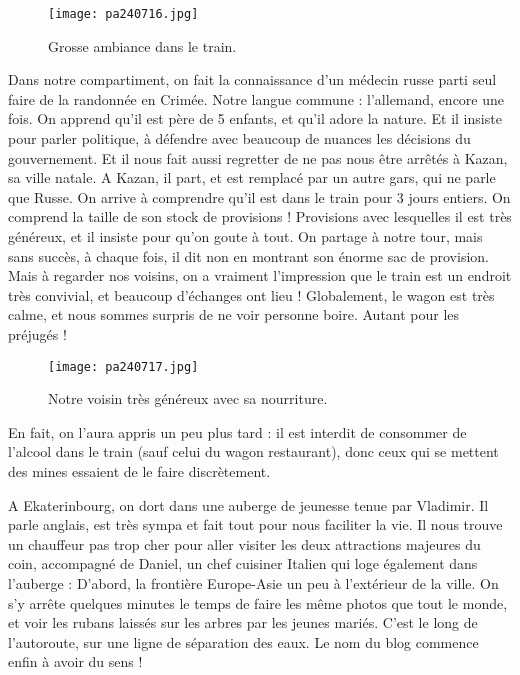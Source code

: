 \documentclass{book}
\begin{document}
\begin{figure}[h]
\centering
\texttt{[image: pa240716.jpg]}
\caption*{ Grosse ambiance dans le train.}
\end{figure}

Dans notre compartiment, on fait la connaissance d'un  médecin russe parti seul faire de la randonnée en Crimée. Notre langue commune : l'allemand, encore une fois. On apprend qu'il est père de 5 enfants, et qu'il adore la nature. Et il insiste pour parler politique, à défendre avec beaucoup de nuances les décisions du gouvernement. Et il nous fait aussi regretter de ne pas nous être arrêtés à Kazan, sa ville natale.
A Kazan, il part, et est remplacé par un autre gars, qui ne parle que Russe. On arrive à comprendre qu'il est dans le train pour 3 jours entiers. On comprend la taille de son stock de provisions ! Provisions avec lesquelles il est très généreux, et il insiste pour qu'on goute à tout. On partage à notre tour, mais sans succès, à chaque fois, il dit non en montrant son énorme sac de provision. Mais à regarder nos voisins, on a vraiment l'impression que le train est un endroit très convivial, et beaucoup d'échanges ont lieu !
Globalement, le wagon est très calme, et nous sommes surpris de ne voir personne boire. Autant pour les préjugés !


\begin{figure}[h]
\centering
\texttt{[image: pa240717.jpg]}
\caption*{ Notre voisin très généreux avec sa nourriture.}
\end{figure}

En fait, on l'aura appris un peu plus tard : il est interdit de consommer de l'alcool dans le train (sauf celui du wagon restaurant), donc ceux qui se mettent des mines essaient de le faire discrètement.

A Ekaterinbourg, on dort dans une auberge de jeunesse tenue par Vladimir. Il parle anglais, est très sympa et fait tout pour nous faciliter la vie. Il nous trouve un chauffeur pas trop cher pour aller visiter les deux attractions majeures du coin, accompagné de Daniel, un chef cuisiner Italien qui loge également dans l'auberge :
D'abord, la frontière Europe-Asie un peu à l'extérieur de la ville. On s'y arrête quelques minutes le temps de faire les même photos que tout le monde, et voir les rubans laissés sur les arbres par les jeunes mariés. C'est le long de l'autoroute, sur une ligne de séparation des eaux. Le nom du blog commence enfin à avoir du sens !
\end{document}
